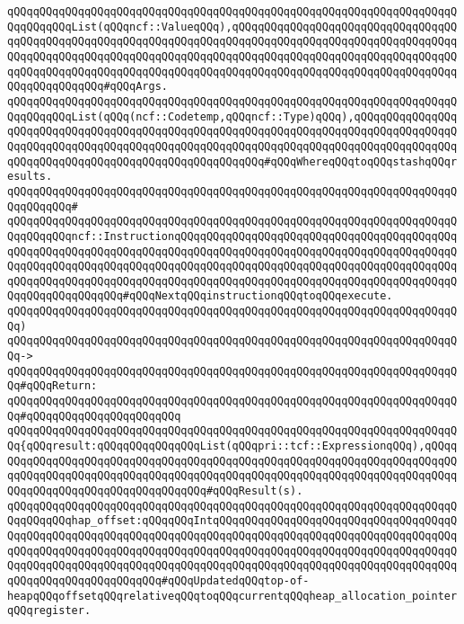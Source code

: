 \verb|qQQqqQQqqQQqqQQqqQQqqQQqqQQqqQQqqQQqqQQqqQQqqQQqqQQqqQQqqQQqqQQqqQQqqQQqqQQqqQQqList(qQQqncf::ValueqQQq),qQQqqQQqqQQqqQQqqQQqqQQqqQQqqQQqqQQqqQQqqQQqqQQqqQQqqQQqqQQqqQQqqQQqqQQqqQQqqQQqqQQqqQQqqQQqqQQqqQQqqQQqqQQqqQQqqQQqqQQqqQQqqQQqqQQqqQQqqQQqqQQqqQQqqQQqqQQqqQQqqQQqqQQqqQQqqQQqqQQqqQQqqQQqqQQqqQQqqQQqqQQqqQQqqQQqqQQqqQQqqQQqqQQqqQQqqQQqqQQqqQQqqQQqqQQqqQQqqQQq#qQQqArgs.|\newline
\verb|qQQqqQQqqQQqqQQqqQQqqQQqqQQqqQQqqQQqqQQqqQQqqQQqqQQqqQQqqQQqqQQqqQQqqQQqqQQqqQQqList(qQQq(ncf::Codetemp,qQQqncf::Type)qQQq),qQQqqQQqqQQqqQQqqQQqqQQqqQQqqQQqqQQqqQQqqQQqqQQqqQQqqQQqqQQqqQQqqQQqqQQqqQQqqQQqqQQqqQQqqQQqqQQqqQQqqQQqqQQqqQQqqQQqqQQqqQQqqQQqqQQqqQQqqQQqqQQqqQQqqQQqqQQqqQQqqQQqqQQqqQQqqQQqqQQqqQQqqQQqqQQqqQQq#qQQqWhereqQQqtoqQQqstashqQQqresults.|\newline
\verb|qQQqqQQqqQQqqQQqqQQqqQQqqQQqqQQqqQQqqQQqqQQqqQQqqQQqqQQqqQQqqQQqqQQqqQQqqQQqqQQq#|\newline
\verb|qQQqqQQqqQQqqQQqqQQqqQQqqQQqqQQqqQQqqQQqqQQqqQQqqQQqqQQqqQQqqQQqqQQqqQQqqQQqqQQqncf::InstructionqQQqqQQqqQQqqQQqqQQqqQQqqQQqqQQqqQQqqQQqqQQqqQQqqQQqqQQqqQQqqQQqqQQqqQQqqQQqqQQqqQQqqQQqqQQqqQQqqQQqqQQqqQQqqQQqqQQqqQQqqQQqqQQqqQQqqQQqqQQqqQQqqQQqqQQqqQQqqQQqqQQqqQQqqQQqqQQqqQQqqQQqqQQqqQQqqQQqqQQqqQQqqQQqqQQqqQQqqQQqqQQqqQQqqQQqqQQqqQQqqQQqqQQqqQQqqQQqqQQqqQQqqQQqqQQq#qQQqNextqQQqinstructionqQQqtoqQQqexecute.|\newline
\verb|qQQqqQQqqQQqqQQqqQQqqQQqqQQqqQQqqQQqqQQqqQQqqQQqqQQqqQQqqQQqqQQqqQQqqQQq)|\newline
\verb|qQQqqQQqqQQqqQQqqQQqqQQqqQQqqQQqqQQqqQQqqQQqqQQqqQQqqQQqqQQqqQQqqQQqqQQq->|\newline
\verb|qQQqqQQqqQQqqQQqqQQqqQQqqQQqqQQqqQQqqQQqqQQqqQQqqQQqqQQqqQQqqQQqqQQqqQQq#qQQqReturn:|\newline
\verb|qQQqqQQqqQQqqQQqqQQqqQQqqQQqqQQqqQQqqQQqqQQqqQQqqQQqqQQqqQQqqQQqqQQqqQQq#qQQqqQQqqQQqqQQqqQQqqQQq|\newline
\verb|qQQqqQQqqQQqqQQqqQQqqQQqqQQqqQQqqQQqqQQqqQQqqQQqqQQqqQQqqQQqqQQqqQQqqQQq{qQQqresult:qQQqqQQqqQQqqQQqList(qQQqpri::tcf::ExpressionqQQq),qQQqqQQqqQQqqQQqqQQqqQQqqQQqqQQqqQQqqQQqqQQqqQQqqQQqqQQqqQQqqQQqqQQqqQQqqQQqqQQqqQQqqQQqqQQqqQQqqQQqqQQqqQQqqQQqqQQqqQQqqQQqqQQqqQQqqQQqqQQqqQQqqQQqqQQqqQQqqQQqqQQqqQQqqQQqqQQq#qQQqResult(s).|\newline
\verb|qQQqqQQqqQQqqQQqqQQqqQQqqQQqqQQqqQQqqQQqqQQqqQQqqQQqqQQqqQQqqQQqqQQqqQQqqQQqqQQqhap_offset:qQQqqQQqIntqQQqqQQqqQQqqQQqqQQqqQQqqQQqqQQqqQQqqQQqqQQqqQQqqQQqqQQqqQQqqQQqqQQqqQQqqQQqqQQqqQQqqQQqqQQqqQQqqQQqqQQqqQQqqQQqqQQqqQQqqQQqqQQqqQQqqQQqqQQqqQQqqQQqqQQqqQQqqQQqqQQqqQQqqQQqqQQqqQQqqQQqqQQqqQQqqQQqqQQqqQQqqQQqqQQqqQQqqQQqqQQqqQQqqQQqqQQqqQQqqQQqqQQqqQQqqQQqqQQqqQQqqQQqqQQq#qQQqUpdatedqQQqtop-of-heapqQQqoffsetqQQqrelativeqQQqtoqQQqcurrentqQQqheap_allocation_pointerqQQqregister.|\newline
